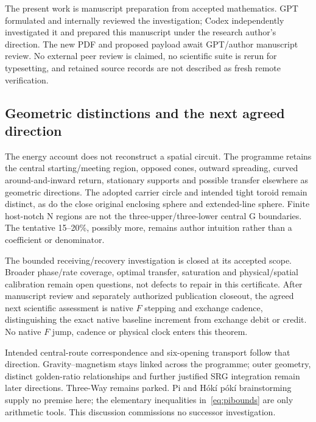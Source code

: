 The present work is manuscript preparation from accepted mathematics. GPT formulated and internally reviewed the investigation; Codex independently investigated it and prepared this manuscript under the research author's direction. The new PDF and proposed payload await GPT/author manuscript review. No external peer review is claimed, no scientific suite is rerun for typesetting, and retained source records are not described as fresh remote verification.

\subsection{Geometric distinctions and the next agreed direction}\label{sec:continuation}
The energy account does not reconstruct a spatial circuit. The programme retains the central starting/meeting region, opposed cones, outward spreading, curved around-and-inward return, stationary supports and possible transfer elsewhere as geometric directions. The adopted carrier circle and intended tight toroid remain distinct, as do the close original enclosing sphere and extended-line sphere. Finite host-notch N regions are not the three-upper/three-lower central G boundaries. The tentative 15--20\%, possibly more, remains author intuition rather than a coefficient or denominator.

The bounded receiving/recovery investigation is closed at its accepted scope. Broader phase/rate coverage, optimal transfer, saturation and physical/spatial calibration remain open questions, not defects to repair in this certificate. After manuscript review and separately authorized publication closeout, the agreed next scientific assessment is native $F$ stepping and exchange cadence, distinguishing the exact native baseline increment from exchange debit or credit. No native $F$ jump, cadence or physical clock enters this theorem.

Intended central-route correspondence and six-opening transport follow that direction. Gravity--magnetism stays linked across the programme; outer geometry, distinct golden-ratio relationships and further justified SRG integration remain later directions. Three-Way remains parked. Pi and H\'ok\'i p\'ok\'i brainstorming supply no premise here; the elementary inequalities in~\eqref{eq:pibounds} are only arithmetic tools. This discussion commissions no successor investigation.

